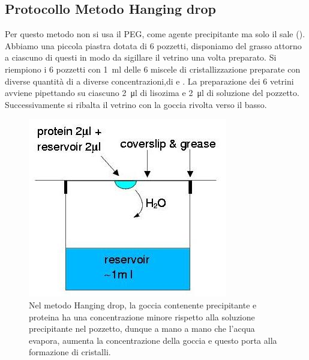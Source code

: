 \documentclass[twocolumn,a4paper,10pt]{my_report}
\begin{document}
{\subsection*{Protocollo Metodo Hanging drop}
Per questo metodo non si usa il PEG, come agente precipitante ma solo il sale ().
Abbiamo una piccola piastra dotata di 6 pozzetti, disponiamo del grasso attorno a ciascuno di questi in modo da sigillare il vetrino una volta preparato.
Si riempiono i 6 pozzetti con \SI{1}{\ml} delle 6 miscele di cristallizzazione preparate con diverse quantità di  a diverse concentrazioni,di  e .
La preparazione dei 6 vetrini avviene pipettando su ciascuno \SI{2}{\ul} di lisozima e \SI{2}{\ul} di soluzione del pozzetto.
Successivamente si ribalta il vetrino con la goccia rivolta verso il basso.
\begin{figure}[ht]
\centering
\includegraphics[width=0.8\linewidth]{hanging.jpg}
\caption{Nel metodo Hanging drop, la goccia contenente precipitante e proteina ha una concentrazione minore rispetto alla soluzione precipitante nel pozzetto, dunque a mano a mano che l'acqua evapora, aumenta la concentrazione della goccia e questo porta alla formazione di cristalli.}
\label{fig:fig13}
\end{figure}


}
\end{document}
